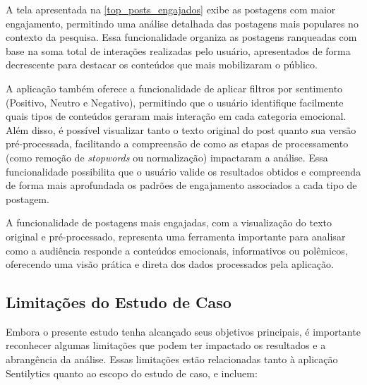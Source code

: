 \documentclass[
	12pt,				%
	oneside,			%
	a4paper,			%
	english,			%
	french,				%
	spanish,			%
	brazil				%
	]{abntex2}
\begin{document}
A tela apresentada na \autoref{top_posts_engajados} exibe as postagens
com maior engajamento, permitindo uma análise detalhada das postagens
mais populares no contexto da pesquisa. Essa funcionalidade organiza as
postagens ranqueadas com base na soma total de interações realizadas
pelo usuário, apresentados de forma decrescente para destacar os
conteúdos que mais mobilizaram o público.

A aplicação também oferece a funcionalidade de aplicar filtros por
sentimento (Positivo, Neutro e Negativo), permitindo que o usuário
identifique facilmente quais tipos de conteúdos geraram mais interação
em cada categoria emocional. Além disso, é possível visualizar tanto o
texto original do post quanto sua versão pré-processada, facilitando a
compreensão de como as etapas de processamento (como remoção de
\emph{stopwords} ou normalização) impactaram a análise. Essa
funcionalidade possibilita que o usuário valide os resultados obtidos e
compreenda de forma mais aprofundada os padrões de engajamento
associados a cada tipo de postagem.

A funcionalidade de postagens mais engajadas, com a visualização do
texto original e pré-processado, representa uma ferramenta importante
para analisar como a audiência responde a conteúdos emocionais,
informativos ou polêmicos, oferecendo uma visão prática e direta dos
dados processados pela aplicação.

\hypertarget{limitauxe7uxf5es-do-estudo-de-caso}{%
\subsection{Limitações do Estudo de
Caso}\label{limitauxe7uxf5es-do-estudo-de-caso}}

Embora o presente estudo tenha alcançado seus objetivos principais, é
importante reconhecer algumas limitações que podem ter impactado os
resultados e a abrangência da análise. Essas limitações estão
relacionadas tanto à aplicação Sentilytics quanto ao escopo do estudo de
caso, e incluem:
\end{document}
